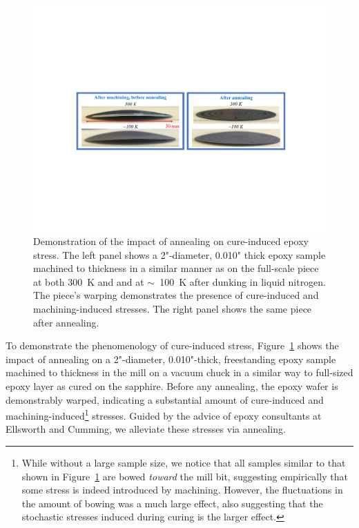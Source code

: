 \begin{figure}[!t]
    \centering
    \includegraphics[width=\linewidth, trim=4cm 7.5cm 3.8cm 8cm, clip]{ARCoating/Figures/epoxy_annealing.pdf}
    \caption[Demonstration of the impact of annealing on cure-induced epoxy stress.]{Demonstration of the impact of annealing on cure-induced epoxy stress. The left panel shows a 2"-diameter, 0.010" thick epoxy sample machined to thickness in a similar manner as on the full-scale piece at both 300~K and and at $\sim$~100~K after dunking in liquid nitrogen. The piece's warping demonstrates the presence of cure-induced and machining-induced stresses. The right panel shows the same piece after annealing.}
    \label{fig:epoxy_annealing}
\end{figure}

To demonstrate the phenomenology of cure-induced stress, Figure~\ref{fig:epoxy_annealing} shows the impact of annealing on a 2"-diameter, 0.010"-thick, freestanding epoxy sample machined to thickness in the mill on a vacuum chuck in a similar way to full-sized epoxy layer as cured on the sapphire. Before any annealing, the epoxy wafer is demonstrably warped, indicating a substantial amount of cure-induced and machining-induced\footnote{While without a large sample size, we notice that all samples similar to that shown in Figure~\ref{fig:epoxy_annealing} are bowed \textit{toward} the mill bit, suggesting empirically that some stress is indeed introduced by machining. However, the fluctuations in the amount of bowing was a much large effect, also suggesting that the stochastic stresses induced during curing is the larger effect.} stresses. Guided by the advice of epoxy consultants at Ellsworth and Cumming, we alleviate these stresses via annealing.

